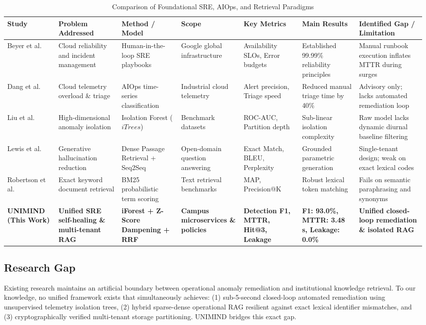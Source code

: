 \documentclass[12pt,onecolumn,draftclsnofoot]{IEEEtran}
\begin{document}
\begin{table}[ht]
\caption{Comparison of Foundational SRE, AIOps, and Retrieval Paradigms}
\centering
\small
\begin{tabular}{p{2.3cm}p{2.2cm}p{2.2cm}p{1.8cm}p{2.0cm}p{2.2cm}p{2.0cm}}
\toprule
\textbf{Study} & \textbf{Problem Addressed} & \textbf{Method / Model} & \textbf{Scope} & \textbf{Key Metrics} & \textbf{Main Results} & \textbf{Identified Gap / Limitation} \\
\midrule
Beyer et al. \cite{beyer2016site} & Cloud reliability and incident management & Human-in-the-loop SRE playbooks & Google global infrastructure & Availability SLOs, Error budgets & Established 99.99\% reliability principles & Manual runbook execution inflates MTTR during surges \\
Dang et al. \cite{dang2020aiops} & Cloud telemetry overload \& triage & AIOps time-series classification & Industrial cloud telemetry & Alert precision, Triage speed & Reduced manual triage time by 40\% & Advisory only; lacks automated remediation loop \\
Liu et al. \cite{liu2008isolation} & High-dimensional anomaly isolation & Isolation Forest ($iTrees$) & Benchmark datasets & ROC-AUC, Partition depth & Sub-linear isolation complexity & Raw model lacks dynamic diurnal baseline filtering \\
Lewis et al. \cite{lewis2020retrieval} & Generative hallucination reduction & Dense Passage Retrieval + Seq2Seq & Open-domain question answering & Exact Match, BLEU, Perplexity & Grounded parametric generation & Single-tenant design; weak on exact lexical codes \\
Robertson et al. \cite{robertson2009probabilistic} & Exact keyword document retrieval & BM25 probabilistic term scoring & Text retrieval benchmarks & MAP, Precision@K & Robust lexical token matching & Fails on semantic paraphrasing and synonyms \\
\textbf{UNIMIND (This Work)} & \textbf{Unified SRE self-healing \& multi-tenant RAG} & \textbf{iForest + Z-Score Dampening + RRF} & \textbf{Campus microservices \& policies} & \textbf{Detection F1, MTTR, Hit@3, Leakage} & \textbf{F1: 93.0\%, MTTR: 3.48 s, Leakage: 0.0\%} & \textbf{Unified closed-loop remediation \& isolated RAG} \\
\bottomrule
\end{tabular}
\end{table}

\subsection{Research Gap}
Existing research maintains an artificial boundary between operational anomaly remediation and institutional knowledge retrieval. To our knowledge, no unified framework exists that simultaneously achieves: (1) sub-5-second closed-loop automated remediation using unsupervised telemetry isolation trees, (2) hybrid sparse-dense operational RAG resilient against exact lexical identifier mismatches, and (3) cryptographically verified multi-tenant storage partitioning. UNIMIND bridges this exact gap.
\end{document}
